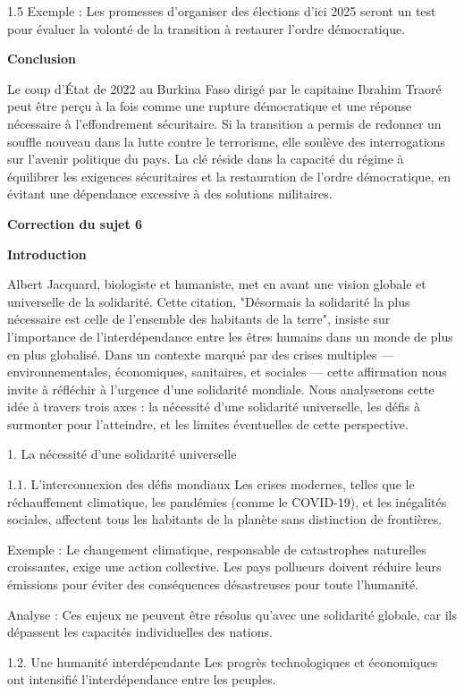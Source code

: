 \documentclass[12pt]{article}
\begin{document}
\begin{spacing}{1.5}
Exemple : Les promesses d'organiser des élections d'ici 2025 seront un test pour évaluer la volonté de la transition à restaurer l'ordre démocratique.

 \textbf{Conclusion}
 
Le coup d'État de 2022 au Burkina Faso dirigé par le capitaine Ibrahim Traoré peut être perçu à la fois comme une rupture démocratique et une réponse nécessaire à l'effondrement sécuritaire. Si la transition a permis de redonner un souffle nouveau dans la lutte contre le terrorisme, elle soulève des interrogations sur l'avenir politique du pays. La clé réside dans la capacité du régime à équilibrer les exigences sécuritaires et la restauration de l'ordre démocratique, en évitant une dépendance excessive à des solutions militaires.



\quad
\quad
\textbf{Correction du sujet 6}

\textbf{Introduction}

Albert Jacquard, biologiste et humaniste, met en avant une vision globale et universelle de la solidarité. Cette citation, "Désormais la solidarité la plus nécessaire est celle de l'ensemble des habitants de la terre", insiste sur l'importance de l'interdépendance entre les êtres humains dans un monde de plus en plus globalisé. Dans un contexte marqué par des crises multiples — environnementales, économiques, sanitaires, et sociales — cette affirmation nous invite à réfléchir à l'urgence d'une solidarité mondiale. Nous analyserons cette idée à travers trois axes : la nécessité d'une solidarité universelle, les défis à surmonter pour l'atteindre, et les limites éventuelles de cette perspective.

1. La nécessité d'une solidarité universelle

1.1. L'interconnexion des défis mondiaux
Les crises modernes, telles que le réchauffement climatique, les pandémies (comme le COVID-19), et les inégalités sociales, affectent tous les habitants de la planète sans distinction de frontières.

Exemple : Le changement climatique, responsable de catastrophes naturelles croissantes, exige une action collective. Les pays pollueurs doivent réduire leurs émissions pour éviter des conséquences désastreuses pour toute l'humanité.

Analyse : Ces enjeux ne peuvent être résolus qu'avec une solidarité globale, car ils dépassent les capacités individuelles des nations.

1.2. Une humanité interdépendante
Les progrès technologiques et économiques ont intensifié l'interdépendance entre les peuples.


\end{spacing}
\end{document}
